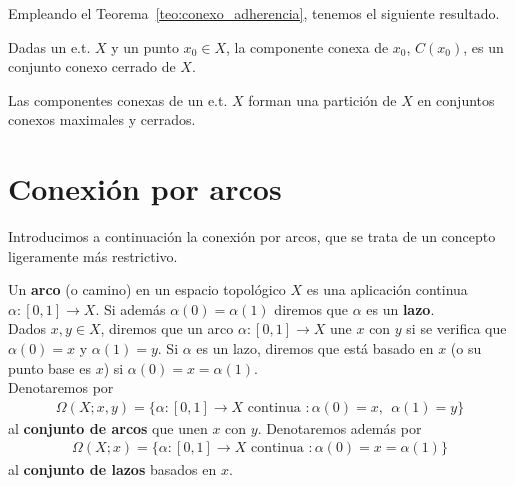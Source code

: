 Empleando el Teorema~\ref{teo:conexo_adherencia}, tenemos el siguiente resultado.
\begin{prop}
    Dadas un e.t. $X$ y un punto $x_0\in X$, la componente conexa de $x_0$, $C(x_0)$, es un conjunto conexo cerrado de $X$.
\end{prop}

\begin{teo}
    Las componentes conexas de un e.t. $X$ forman una partición de $X$ en conjuntos conexos maximales y cerrados.
\end{teo}

\section{Conexión por arcos}

Introducimos a continuación la conexión por arcos, que se trata de un concepto ligeramente más restrictivo.

\begin{definicion}
    Un \textbf{arco} (o camino) en un espacio topológico $X$ es una aplicación continua $\alpha:[0,1]\to X$. Si además $\alpha(0) = \alpha(1)$ diremos que $\alpha$ es un \textbf{lazo}.\\

    Dados $x,y\in X$, diremos que un arco $\alpha:[0,1]\to X$ une $x$ con $y$ si se verifica que $\alpha(0)=x$ y $\alpha(1) = y$. Si $\alpha$ es un lazo, diremos que está basado en $x$ (o su punto base es $x$) si $\alpha(0)=x=\alpha(1)$.\\

    Denotaremos por 
    \begin{gather*}
        \Omega(X;x,y) = \{\alpha:[0,1]\to X \text{ continua } : \alpha(0)=x, \ \ \alpha(1)=y\}
    \end{gather*}
    al \textbf{conjunto de arcos} que unen $x$ con $y$. Denotaremos además por  
    \begin{gather*}
        \Omega(X;x) = \{\alpha:[0,1]\to X \text{ continua } : \alpha(0)=x=\alpha(1)\}
    \end{gather*}
    al \textbf{conjunto de lazos} basados en $x$.
\end{definicion}

